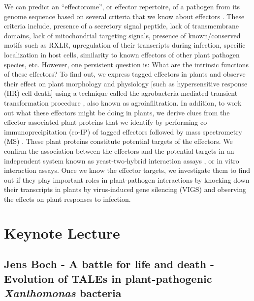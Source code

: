 \documentclass[12pt,]{book}
\theoremstyle{definition}
\theoremstyle{definition}
\theoremstyle{remark}
\begin{document}
We can predict an ``effectorome'', or effector repertoire, of a pathogen
from its genome sequence based on several criteria that we know about
effectors \citep{Saunders:2012bw}. These criteria include, presence of a
secretory signal peptide, lack of transmembrane domains, lack of
mitochondrial targeting signals, presence of known/conserved motifs such
as RXLR, upregulation of their transcripts during infection, specific
localization in host cells, similarity to known effectors of other plant
pathogen species, etc. However, one persistent question is: What are the
intrinsic functions of these effectors? To find out, we express tagged
effectors in plants and observe their effect on plant morphology and
physiology {[}such as hypersensitive response (HR) cell death{]} using a
technique called the agrobacteria-mediated transient transformation
procedure \citep{Kapila:1997}, also known as agroinfiltration. In
addition, to work out what these effectors might be doing in plants, we
derive clues from the effector-associated plant proteins that we
identify by performing co-immunoprecipitation (co-IP) of tagged
effectors followed by mass spectrometry (MS) \citep{Win:2011dw}. These
plant proteins constitute potential targets of the effectors. We confirm
the association between the effectors and the potential targets in an
independent system known as yeast-two-hybrid interaction assays
\citep{Fields:1989dm}, or in vitro interaction assays. Once we know the
effector targets, we investigate them to find out if they play important
roles in plant-pathogen interactions by knocking down their transcripts
in plants by virus-induced gene silencing (VIGS) \citep{Lindbo:1993kp}
and observing the effects on plant responses to infection.

\section*{Keynote Lecture}\label{keynote-lecture-2}

\subsection*{\texorpdfstring{Jens Boch - A battle for life and death -
Evolution of TALEs in plant-pathogenic \emph{Xanthomonas}
bacteria}{Jens Boch - A battle for life and death - Evolution of TALEs in plant-pathogenic Xanthomonas bacteria}}\label{jens-boch---a-battle-for-life-and-death---evolution-of-tales-in-plant-pathogenic-xanthomonas-bacteria}
\end{document}
